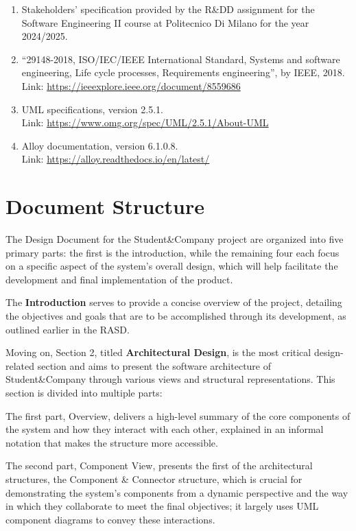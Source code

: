 \begin{enumerate}
    \item Stakeholders’ specification provided by the R\&DD assignment for the Software Engineering II course at Politecnico Di Milano for the year 2024/2025.
    \item ``29148-2018, ISO/IEC/IEEE International Standard, Systems and software engineering, Life cycle processes, Requirements engineering'', by IEEE, 2018. \\
    Link: \url{https://ieeexplore.ieee.org/document/8559686}
    \item UML specifications, version 2.5.1. \\
    Link: \url{https://www.omg.org/spec/UML/2.5.1/About-UML}
    \item Alloy documentation, version 6.1.0.8. \\
    Link: \url{https://alloy.readthedocs.io/en/latest/}
\end{enumerate}

\newpage
\section{Document Structure}
The Design Document for the Student\&Company project are organized into five primary parts: the first
is the introduction, while the remaining four each focus on a specific aspect of the system's overall design,
which will
help facilitate the development and final implementation of the product.

The \textbf{Introduction} serves to
provide a concise overview of the project, detailing the objectives and goals that are to be accomplished
through its development, as outlined earlier in the RASD.

Moving on, Section 2, titled \textbf{Architectural Design},
is the most critical design-related section and aims to present the software architecture of Student\&Company
through various views and structural representations. This section is divided into multiple parts: 

The first part, Overview, delivers a high-level summary of the core components of the system and how
they interact with each other, explained in an informal notation that makes the structure more accessible.

The second part, Component View, presents the first of the architectural structures, the Component \&
Connector structure, which is crucial for demonstrating the system’s components from a dynamic perspective
and the way in which they collaborate to meet the final objectives; it largely uses UML component diagrams
to convey these interactions.

